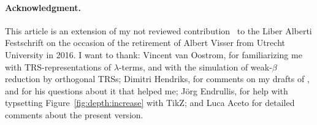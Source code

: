 \documentclass[
submission
]{dmtcs-episciences-tampered}
\newcommand{\nb}{\nobreakdash}
\newcommand{\TRS}{TRS}
\newcommand{\TRSs}{TRSs}
\newcommand{\lambdaterm}{$\lambda$\nb-term}
\newcommand{\lambdaterms}{\lambdaterm{s}}
\newcommand{\TRSrepresentation}{\TRS\nb-re\-pre\-sen\-ta\-tion}
\theoremstyle{plain}
\theoremstyle{definition}
\begin{document}
\paragraph{Acknowledgment.}
  This article is an extension of my not reviewed contribution~\cite{grab:2016:lindepthincrease:liber:alberti}
  to the Liber Alberti Festschrift on the occasion of the retirement of Albert Visser from Utrecht University in 2016. 
  I want to thank: 
  Vincent van Oostrom, for familiarizing me with \TRSrepresentation{s} of \lambdaterms,
  and with the simulation of weak-$\beta$ reduction by orthogonal \TRSs;
  Dimitri Hendriks, for comments on my drafts of \cite{grab:2016:lindepthincrease:liber:alberti},
  and for his questions about it that helped me;
  J\"{o}rg Endrullis, for help with typsetting Figure~\ref{fig:depth:increase} with TikZ;
  and Luca Aceto for detailed comments about the present version.



\label{sec:biblio}
\end{document}
